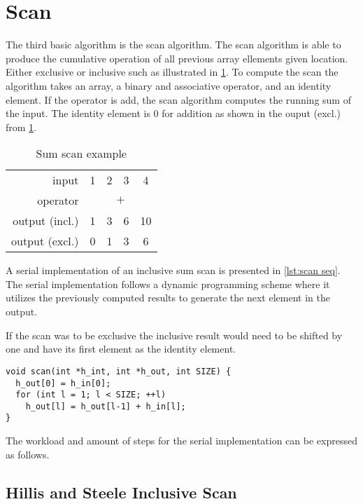 \section{Scan}
\label{sec:scan}

The third basic algorithm is the scan algorithm.
The scan algorithm is able to produce the cumulative operation of all previous array ellements given location.
Either exclusive or inclusive such as illustrated in \cref{tab:scan example}.
To compute the scan the algorithm takes an array, a binary and associative operator, and an identity element.
If the operator is add, the scan algorithm computes the running sum of the input.
The identity element is 0 for addition as shown in the ouput (excl.) from \cref{tab:scan example}.

\begin{table}[htb]
  \centering
  \begin{tabular}{r | c c c c}
    \toprule
    input & 1 & 2 & 3 & 4 \\
    operator & \multicolumn{4}{c}{$\mathtt{+}$} \\
    output (incl.) & 1 & 3 & 6 & 10 \\
    output (excl.) & 0 & 1 & 3 & 6 \\
    \bottomrule
  \end{tabular}
  \caption{Sum scan example}
  \label{tab:scan example}
\end{table}
    
A serial implementation of an inclusive sum scan is presented in \cref{lst:scan seq}.
The serial implementation follows a dynamic programming scheme where it utilizes the previously computed results to generate the next element in the output.

If the scan was to be exclusive the inclusive result would need to be shifted by one and have its first element as the identity element.
\begin{lstlisting}[caption={Serial scan}, label={lst:scan seq}]
void scan(int *h_int, int *h_out, int SIZE) {
  h_out[0] = h_in[0];
  for (int l = 1; l < SIZE; ++l)
    h_out[l] = h_out[l-1] + h_in[l];
}
\end{lstlisting}

The workload and amount of steps for the serial implementation can be expressed as follows.

\subsection{Hillis and Steele Inclusive Scan}
\label{sec:hillis and steele scan}

